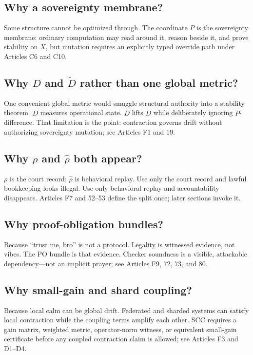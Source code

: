 \documentclass[10pt,oneside]{article}
\theoremstyle{definition}
\theoremstyle{remark}
\begin{document}
\subsection{Why a sovereignty membrane?}
Some structure cannot be optimized through. The coordinate \(P\) is the sovereignty membrane: ordinary computation may read around it, reason beside it, and prove stability on \(X\), but mutation requires an explicitly typed override path under Articles C6 and C10.

\subsection{Why \(D\) and \(\widetilde{D}\) rather than one global metric?}
One convenient global metric would smuggle structural authority into a stability theorem. \(D\) measures operational state. \(\widetilde D\) lifts \(D\) while deliberately ignoring \(P\)-difference. That limitation is the point: contraction governs drift without authorizing sovereignty mutation; see Articles F1 and 19.

\subsection{Why \(\rho\) and \(\widehat{\rho}\) both appear?}
\(\rho\) is the court record; \(\widehat\rho\) is behavioral replay. Use only the court record and lawful bookkeeping looks illegal. Use only behavioral replay and accountability disappears. Articles F7 and 52--53 define the split once; later sections invoke it.

\subsection{Why proof-obligation bundles?}
Because ``trust me, bro'' is not a protocol. Legality is witnessed evidence, not vibes. The PO bundle is that evidence. Checker soundness is a visible, attackable dependency---not an implicit prayer; see Articles F9, 72, 73, and 80.

\subsection{Why small-gain and shard coupling?}
Because local calm can be global drift. Federated and sharded systems can satisfy local contraction while the coupling terms amplify each other. SCC requires a gain matrix, weighted metric, operator-norm witness, or equivalent small-gain certificate before any coupled contraction claim is allowed; see Articles F3 and D1--D4.
\end{document}
